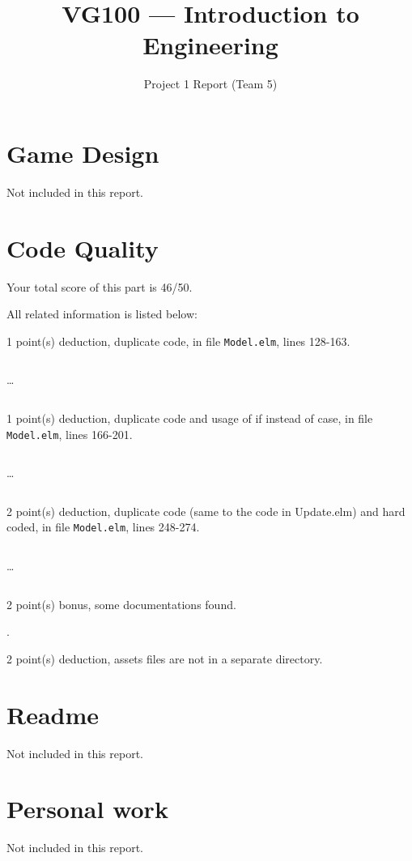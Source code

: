 \documentclass{article}
\title{VG100 --- Introduction to\\ Engineering}
\subtitle{Project 1 Report (Team 5)}
\begin{document}
\maketitle

\section{Game Design}

Not included in this report.

\section{Code Quality}

Your total score of this part is 46/50. \medskip

All related information is listed below: \medskip

1 point(s) {\color{red}deduction}, duplicate code, in file {\color{blue}\texttt{Model.elm}}, lines {\color{blue}128-163}.

\inputminted[firstline=128,lastline=137]{elm}{Model.elm}

\dots

\inputminted[firstline=154,lastline=163]{elm}{Model.elm}

1 point(s) {\color{red}deduction}, duplicate code and usage of if instead of case, in file {\color{blue}\texttt{Model.elm}}, lines {\color{blue}166-201}.

\inputminted[firstline=166,lastline=175]{elm}{Model.elm}

\dots

\inputminted[firstline=192,lastline=201]{elm}{Model.elm}

2 point(s) {\color{red}deduction}, duplicate code (same to the code in Update.elm) and hard coded, in file {\color{blue}\texttt{Model.elm}}, lines {\color{blue}248-274}.

\inputminted[firstline=248,lastline=257]{elm}{Model.elm}

\dots

\inputminted[firstline=265,lastline=274]{elm}{Model.elm}

2 point(s) {\color{red}bonus}, some documentations found.\medskip

.\medskip

2 point(s) {\color{red}deduction}, assets files are not in a separate directory.\medskip



\newpage

\section{Readme}

Not included in this report.

\section{Personal work}

Not included in this report.


\newpage
\end{document}
